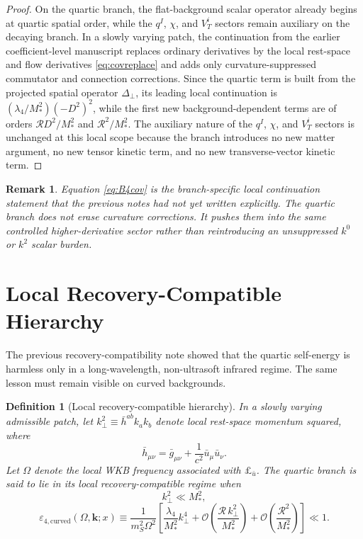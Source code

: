 \documentclass[11pt]{article}
\newtheorem{definition}{Definition}
\newtheorem{remark}{Remark}
\begin{document}
\begin{proof}
On the quartic branch, the flat-background scalar operator already begins at quartic spatial order, while the \(q^I\), \(\chi\), and \(V_T^i\) sectors remain auxiliary on the decaying branch. In a slowly varying patch, the continuation from the earlier coefficient-level manuscript replaces ordinary derivatives by the local rest-space and flow derivatives \eqref{eq:covreplace} and adds only curvature-suppressed commutator and connection corrections. Since the quartic term is built from the projected spatial operator \(\Delta_\perp\), its leading local continuation is \((\lambda_4/M_*^2)(-D^2)^2\), while the first new background-dependent terms are of orders \(\mathcal R D^2/M_*^2\) and \(\mathcal R^2/M_*^2\). The auxiliary nature of the \(q^I\), \(\chi\), and \(V_T^i\) sectors is unchanged at this local scope because the branch introduces no new matter argument, no new tensor kinetic term, and no new transverse-vector kinetic term.
\end{proof}

\begin{remark}
Equation \eqref{eq:B4cov} is the branch-specific local continuation statement that the previous notes had not yet written explicitly. The quartic branch does not erase curvature corrections. It pushes them into the same controlled higher-derivative sector rather than reintroducing an unsuppressed \(k^0\) or \(k^2\) scalar burden.
\end{remark}

\section{Local Recovery-Compatible Hierarchy}

The previous recovery-compatibility note showed that the quartic self-energy is harmless only in a long-wavelength, non-ultrasoft infrared regime. The same lesson must remain visible on curved backgrounds.

\begin{definition}[Local recovery-compatible hierarchy]
In a slowly varying admissible patch, let \(k_\perp^2\equiv \bar h^{ab}k_a k_b\) denote local rest-space momentum squared, where
\begin{equation}
\bar h_{\mu\nu}
=
\bar g_{\mu\nu}
+ \frac{1}{c^2}\bar u_\mu \bar u_\nu.
\label{eq:restprojector}
\end{equation}
Let \(\Omega\) denote the local WKB frequency associated with \(\pounds_{\bar u}\). The quartic branch is said to lie in its local recovery-compatible regime when
\begin{equation}
k_\perp^2\ll M_*^2,
\label{eq:kperphierarchy}
\end{equation}
\begin{equation}
\varepsilon_{4,\mathrm{curved}}(\Omega,\mathbf{k};x)
\equiv
\frac{1}{m_S^2\Omega^2}
\left[
\frac{\lambda_4}{M_*^2}k_\perp^4
+ \mathcal O\!\left(\frac{\mathcal R\,k_\perp^2}{M_*^2}\right)
+ \mathcal O\!\left(\frac{\mathcal R^2}{M_*^2}\right)
\right]
\ll 1.
\label{eq:epsiloncurved}
\end{equation}
\end{definition}
\end{document}
